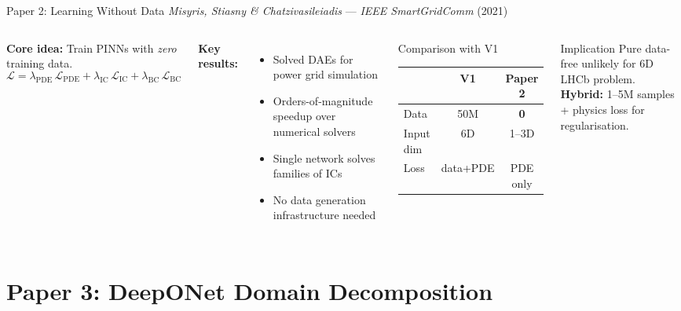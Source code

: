 \documentclass[aspectratio=169, 11pt]{beamer}
\begin{document}
\begin{frame}{Paper 2: Learning Without Data}
  \textit{Misyris, Stiasny \& Chatzivasileiadis} --- \textit{IEEE SmartGridComm} (2021)

  \begin{columns}[T]
    \textbf{Core idea:} Train PINNs with \emph{zero} training data.
    \[
      \mathcal{L} = \lambda_\text{PDE}\,\mathcal{L}_\text{PDE} + \lambda_\text{IC}\,\mathcal{L}_\text{IC} + \lambda_\text{BC}\,\mathcal{L}_\text{BC}
    \]

    \textbf{Key results:}
    \begin{itemize}
      \item Solved DAEs for power grid simulation
      \item Orders-of-magnitude speedup over numerical solvers
      \item Single network solves families of ICs
      \item No data generation infrastructure needed
    \end{itemize}

    \begin{block}{Comparison with V1}
      \centering\small
      \begin{tabular}{lcc}
        \toprule
        & \textbf{V1} & \textbf{Paper 2} \\
        \midrule
        Data & 50M & \textbf{0} \\
        Input dim & 6D & 1--3D \\
        Loss & data+PDE & PDE only \\
        \bottomrule
      \end{tabular}
    \end{block}

    \begin{exampleblock}{Implication}
      Pure data-free unlikely for 6D LHCb problem. \\
      \textbf{Hybrid:} 1--5M samples + physics loss for regularisation.
    \end{exampleblock}
  \end{columns}
\end{frame}

\section{Paper 3: DeepONet Domain Decomposition}
\end{document}
